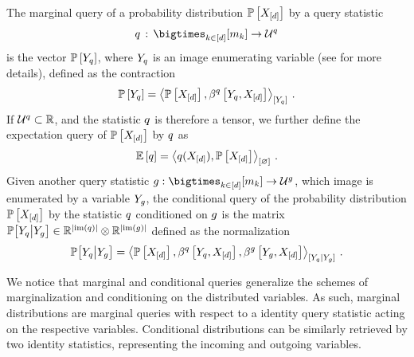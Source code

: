 \begin{definition}
    \label{def:queries}
    The marginal query of a probability distribution $\mathbb{P}\left[X_{[d]}\right]$ by a query statistic
    \begin{align*}
        \exfunction \defcols \facstates \rightarrow \arbsetof{\exfunction}
    \end{align*}
    is the vector $\mathbb{P}\left[Y_{q}\right]$, where $Y_{q}$ is an image enumerating variable (see  for more details), defined as the contraction
    \begin{align*}
        \probat{\headvariableof{\exfunction}}
        = \contractionof{\probat{\shortcatvariables},\bencodingofat{\exfunction}{\headvariableof{\exfunction},\shortcatvariables}}{\headvariableof{\exfunction}} \, .
    \end{align*}
    If $\mathcal{U}^{q}\subset\mathbb{R}$, and the statistic $q$ is therefore a tensor, we further define the expectation query of $\mathbb{P}\left[X_{[d]}\right]$ by $q$ as
    \begin{align*}
        \mathbb{E}\left[q\right] = \left\langle q(X_{[d]}),\mathbb{P}\left[X_{[d]}\right]\right\rangle_{\left[ \varnothing \right]} \, .
    \end{align*}
    Given another query statistic $\secexfunction: \facstates \rightarrow \arbsetof{\secexfunction}$, which image is enumerated by a variable $Y_{g}$, the conditional query of the probability distribution $\mathbb{P}\left[X_{[d]}\right]$ by the statistic $q$ conditioned on $g$ is the matrix $\mathbb{P}\big[Y_{q}\big|Y_{g}\big]\in\mathbb{R}^{\left|\mathrm{im}\left(q\right)\right|}\otimes \mathbb{R}^{\left|\mathrm{im}\left(g\right)\right|}$ defined as the normalization
    \begin{align*}
        \condprobof{\headvariableof{\exfunction}}{\headvariableof{\secexfunction}}
        = \normalizationofwrt{
            \probat{\shortcatvariables},\bencodingofat{\exfunction}{\headvariableof{\exfunction},\shortcatvariables},\bencodingofat{\secexfunction}{\headvariableof{\secexfunction},\shortcatvariables}
        }{
            \headvariableof{\exfunction}}{\headvariableof{\secexfunction}
        } \, .
    \end{align*}
\end{definition}

We notice that marginal and conditional queries generalize the schemes of marginalization and conditioning on the distributed variables.
As such, marginal distributions are marginal queries with respect to a identity query statistic acting on the respective variables.
Conditional distributions can be similarly retrieved by two identity statistics, representing the incoming and outgoing variables.

